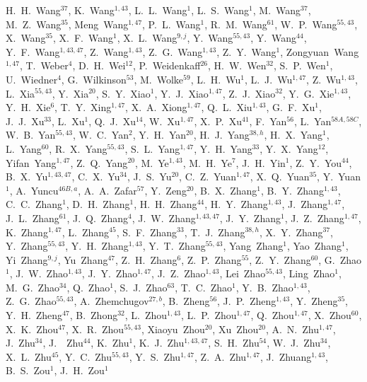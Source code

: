 \begin{small}
\begin{center}
H.~H.~Wang$^{37}$, K.~Wang$^{1,43}$, L.~L.~Wang$^{1}$, L.~S.~Wang$^{1}$, M.~Wang$^{37}$, M.~Z.~Wang$^{35}$, Meng~Wang$^{1,47}$, P.~L.~Wang$^{1}$, R.~M.~Wang$^{61}$, W.~P.~Wang$^{55,43}$, X.~Wang$^{35}$, X.~F.~Wang$^{1}$, X.~L.~Wang$^{9,j}$, Y.~Wang$^{55,43}$, Y.~Wang$^{44}$, Y.~F.~Wang$^{1,43,47}$, Z.~Wang$^{1,43}$, Z.~G.~Wang$^{1,43}$, Z.~Y.~Wang$^{1}$, Zongyuan~Wang$^{1,47}$, T.~Weber$^{4}$, D.~H.~Wei$^{12}$, P.~Weidenkaff$^{26}$, H.~W.~Wen$^{32}$, S.~P.~Wen$^{1}$, U.~Wiedner$^{4}$, G.~Wilkinson$^{53}$, M.~Wolke$^{59}$, L.~H.~Wu$^{1}$, L.~J.~Wu$^{1,47}$, Z.~Wu$^{1,43}$, L.~Xia$^{55,43}$, Y.~Xia$^{20}$, S.~Y.~Xiao$^{1}$, Y.~J.~Xiao$^{1,47}$, Z.~J.~Xiao$^{32}$, Y.~G.~Xie$^{1,43}$, Y.~H.~Xie$^{6}$, T.~Y.~Xing$^{1,47}$, X.~A.~Xiong$^{1,47}$, Q.~L.~Xiu$^{1,43}$, G.~F.~Xu$^{1}$, J.~J.~Xu$^{33}$, L.~Xu$^{1}$, Q.~J.~Xu$^{14}$, W.~Xu$^{1,47}$, X.~P.~Xu$^{41}$, F.~Yan$^{56}$, L.~Yan$^{58A,58C}$, W.~B.~Yan$^{55,43}$, W.~C.~Yan$^{2}$, Y.~H.~Yan$^{20}$, H.~J.~Yang$^{38,h}$, H.~X.~Yang$^{1}$, L.~Yang$^{60}$, R.~X.~Yang$^{55,43}$, S.~L.~Yang$^{1,47}$, Y.~H.~Yang$^{33}$, Y.~X.~Yang$^{12}$, Yifan~Yang$^{1,47}$, Z.~Q.~Yang$^{20}$, M.~Ye$^{1,43}$, M.~H.~Ye$^{7}$, J.~H.~Yin$^{1}$, Z.~Y.~You$^{44}$, B.~X.~Yu$^{1,43,47}$, C.~X.~Yu$^{34}$, J.~S.~Yu$^{20}$, C.~Z.~Yuan$^{1,47}$, X.~Q.~Yuan$^{35}$, Y.~Yuan$^{1}$, A.~Yuncu$^{46B,a}$, A.~A.~Zafar$^{57}$, Y.~Zeng$^{20}$, B.~X.~Zhang$^{1}$, B.~Y.~Zhang$^{1,43}$, C.~C.~Zhang$^{1}$, D.~H.~Zhang$^{1}$, H.~H.~Zhang$^{44}$, H.~Y.~Zhang$^{1,43}$, J.~Zhang$^{1,47}$, J.~L.~Zhang$^{61}$, J.~Q.~Zhang$^{4}$, J.~W.~Zhang$^{1,43,47}$, J.~Y.~Zhang$^{1}$, J.~Z.~Zhang$^{1,47}$, K.~Zhang$^{1,47}$, L.~Zhang$^{45}$, S.~F.~Zhang$^{33}$, T.~J.~Zhang$^{38,h}$, X.~Y.~Zhang$^{37}$, Y.~Zhang$^{55,43}$, Y.~H.~Zhang$^{1,43}$, Y.~T.~Zhang$^{55,43}$, Yang~Zhang$^{1}$, Yao~Zhang$^{1}$, Yi~Zhang$^{9,j}$, Yu~Zhang$^{47}$, Z.~H.~Zhang$^{6}$, Z.~P.~Zhang$^{55}$, Z.~Y.~Zhang$^{60}$, G.~Zhao$^{1}$, J.~W.~Zhao$^{1,43}$, J.~Y.~Zhao$^{1,47}$, J.~Z.~Zhao$^{1,43}$, Lei~Zhao$^{55,43}$, Ling~Zhao$^{1}$, M.~G.~Zhao$^{34}$, Q.~Zhao$^{1}$, S.~J.~Zhao$^{63}$, T.~C.~Zhao$^{1}$, Y.~B.~Zhao$^{1,43}$, Z.~G.~Zhao$^{55,43}$, A.~Zhemchugov$^{27,b}$, B.~Zheng$^{56}$, J.~P.~Zheng$^{1,43}$, Y.~Zheng$^{35}$, Y.~H.~Zheng$^{47}$, B.~Zhong$^{32}$, L.~Zhou$^{1,43}$, L.~P.~Zhou$^{1,47}$, Q.~Zhou$^{1,47}$, X.~Zhou$^{60}$, X.~K.~Zhou$^{47}$, X.~R.~Zhou$^{55,43}$, Xiaoyu~Zhou$^{20}$, Xu~Zhou$^{20}$, A.~N.~Zhu$^{1,47}$, J.~Zhu$^{34}$, J.~~Zhu$^{44}$, K.~Zhu$^{1}$, K.~J.~Zhu$^{1,43,47}$, S.~H.~Zhu$^{54}$, W.~J.~Zhu$^{34}$, X.~L.~Zhu$^{45}$, Y.~C.~Zhu$^{55,43}$, Y.~S.~Zhu$^{1,47}$, Z.~A.~Zhu$^{1,47}$, J.~Zhuang$^{1,43}$, B.~S.~Zou$^{1}$, J.~H.~Zou$^{1}$

\end{center}
\end{small}
